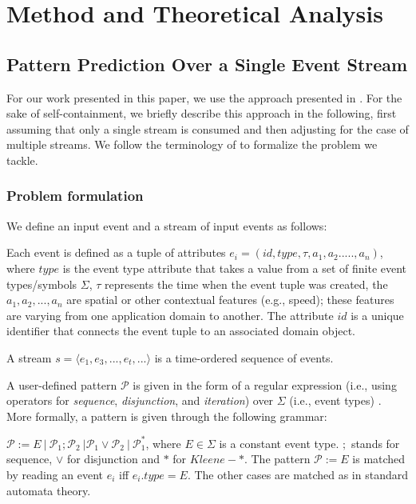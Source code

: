 \chapter{Method and Theoretical Analysis}
\label{sec:system}
\section{Pattern Prediction Over a Single Event Stream}


For our work presented in this paper,
we use the approach presented in \cite{alevizos2017event}.
For the sake of self-containment,
we briefly describe this approach in the following,
first assuming that only a single stream is consumed
and then adjusting for the case of multiple streams.
We follow the terminology of \cite{schultz2009distributed,luckham2008power,alevizos2015complex,zhou_pattern_2015} to formalize the problem we tackle.

\subsection{Problem formulation}

We define an input event and a stream of input events as follows:  
\begin{definition}
	Each event is defined as a tuple of attributes $e_i = (id,type,\tau,a_1,a_2.....,a_n)$, where $type$ is the event type attribute that takes a value from a set of finite event types/symbols $\Sigma$, $\tau$ represents the time when the event tuple was created,  the  $a_1,a_2,...,a_n$ are spatial or other contextual features (e.g., speed); these features are varying from one application domain to another. The attribute $id$ is a unique identifier that connects the event tuple to an associated domain object.
\end{definition}

\begin{definition}
A stream $s=\langle e_1,e_3,...,e_t,...\rangle$  is a time-ordered sequence of events.
\end{definition}

\par A user-defined pattern $\mathcal{P}$ is given in the form of a regular expression (i.e., using operators for \textit{sequence}, \textit{disjunction}, and \textit{iteration}) over $\Sigma$ (i.e., event types) \cite{alevizos2017event}.
More formally, a pattern is given through the following grammar:
\begin{definition}
$\mathcal{P} := E\ |\ \mathcal{P}_{1} ; \mathcal{P}_{2}\ | \mathcal{P}_{1} \vee \mathcal{P}_{2}\ |\ \mathcal{P}_{1}^{*}  $, where $E \in \Sigma$ is a constant event type. $;$ stands for sequence, $\vee$ for disjunction and $*$ for $\mathit{Kleene}-*$.
The pattern $\mathcal{P} := E$ is matched by reading an event $e_i$ iff $e_{i}.type = E$.
The other cases are matched as in standard automata theory.
\end{definition}


